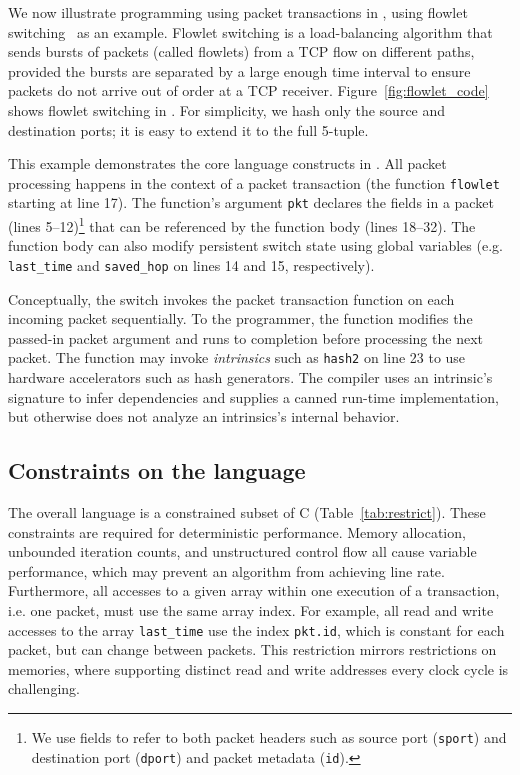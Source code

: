 We now illustrate programming using packet transactions in \pktlanguage, using
flowlet switching~\cite{flowlets} as an example. Flowlet switching is a
load-balancing algorithm that sends bursts of packets (called flowlets) from a
TCP flow on different paths, provided the bursts are separated by a large
enough time interval to ensure packets do not arrive out of order at a TCP
receiver. Figure~\ref{fig:flowlet_code} shows flowlet switching in
\pktlanguage. For simplicity, we hash only the source and destination ports; it
is easy to extend it to the full 5-tuple.

This example demonstrates the core language constructs in \pktlanguage. All
packet processing happens in the context of a packet transaction (the function
\texttt{flowlet} starting at line 17). The function's argument {\tt pkt}
declares the fields in a packet (lines 5--12)\footnote{We use fields to refer
to both packet headers such as source port ({\tt sport}) and destination port
({\tt dport}) and packet metadata ({\tt id}).} that can be referenced by the
function body (lines 18--32).  The function body can also modify persistent
switch state using global variables (e.g.  \texttt{last\_time} and
\texttt{saved\_hop} on lines 14 and 15, respectively).

Conceptually, the switch invokes the packet transaction function on each
incoming packet sequentially. To the programmer, the function modifies the
passed-in packet argument and runs to completion before processing the next
packet.  The function may invoke \textit{intrinsics} such as \texttt{hash2} on
line 23 to use hardware accelerators such as hash generators.  The \pktlanguage
compiler uses an intrinsic's signature to infer dependencies and supplies a
canned run-time implementation, but otherwise does not analyze an intrinsics's
internal behavior.

\subsection{Constraints on the language}
The overall language is a constrained subset of C
(Table~\ref{tab:restrict}).  These constraints are required for
deterministic performance.  Memory allocation, unbounded iteration
counts, and unstructured control flow all cause variable performance,
which may prevent an algorithm from achieving line rate.
Furthermore, all accesses to a given array within one execution of a
transaction, i.e. one packet, must use the same array index. For
example, all read and write accesses to the array \texttt{last\_time}
use the index \texttt{pkt.id}, which is constant for each packet, but
can change between packets. This restriction mirrors restrictions on
memories, where supporting distinct read and write addresses every
clock cycle is challenging.

